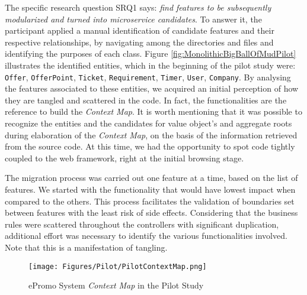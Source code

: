 \documentclass[a4paper,twoside]{article}
\begin{document}
The specific research question SRQ1 says: \textit{find features to be subsequently modularized and turned into microservice candidates}. To answer it, the participant applied a manual identification of candidate features and their respective relationships, by navigating among the directories and files and identifying the purposes of each class. Figure \ref{fig:MonolithicBigBallOfMudPilot} illustrates the identified entities, which in the beginning of the pilot study were: \texttt{Offer}, \texttt{OfferPoint}, \texttt{Ticket}, \texttt{Requirement}, \texttt{Timer}, \texttt{User}, \texttt{Company}. By analysing the features associated to these entities, we acquired an initial perception of how they are tangled and scattered in the code. In fact, the functionalities are the reference to build the \textit{Context Map}. It is worth mentioning that it was possible to recognize the entities and the candidates for value object's and aggregate roots during elaboration of the \textit{Context Map}, on the basis of the information retrieved from the source code. At this time, we had the opportunity to spot code tightly coupled to the web framework, right at the initial browsing stage.

The migration process was carried out one feature at a time, based on the list of features. We started with the functionality that would have lowest impact when compared to the others. This process facilitates the validation of boundaries set between features with the least risk of side effects. Considering that the business rules were scattered throughout the controllers with significant duplication, additional effort was necessary to identify the various functionalities involved. Note that this is a manifestation of tangling.

\begin{figure}
\centering
\texttt{[image: Figures/Pilot/PilotContextMap.png]}
\caption{ePromo System \textit{Context Map} in the Pilot Study \cite{henriqueITNG2019expReport}}
\label{fig:PilotContextMap}
\end{figure}
\end{document}
